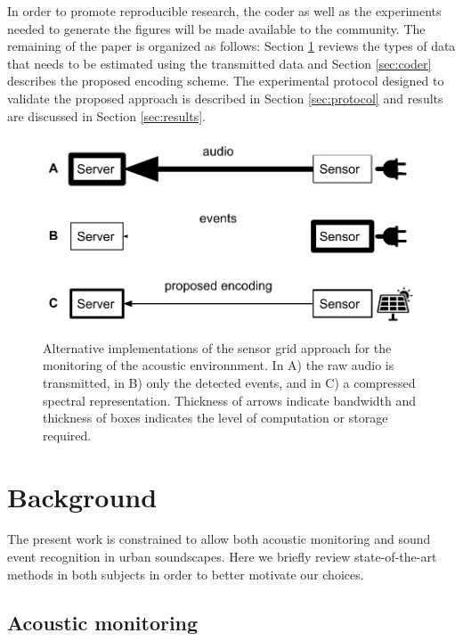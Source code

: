 \documentclass[final,3p,times,twocolumn]{elsarticle}
\begin{document}
In order to promote reproducible research, the coder as well as the experiments needed to generate the figures will be made available to the community. The remaining of the paper is organized as follows: Section \ref{sec:background} reviews the types of data that needs to be estimated using the transmitted data and Section \ref{sec:coder} describes the proposed encoding scheme. The experimental protocol designed to validate the proposed approach is described in Section \ref{sec:protocol} and results are discussed in Section \ref{sec:results}.


\begin{figure}[t]
\includegraphics[width=\columnwidth]{figures/censeCoder}
\vspace{-0.15in}
\caption{Alternative implementations of the sensor grid approach for the monitoring of the acoustic environnment. In A) the raw audio is transmitted, in B) only the detected events, and in C) a compressed spectral representation. Thickness of arrows indicate bandwidth and thickness of boxes indicates the level of computation or storage required.}
\label{fig:codingScheme}
\end{figure}


\section{Background} \label{sec:background}


The present work is constrained to allow both acoustic monitoring and sound event recognition in urban soundscapes. Here we briefly review state-of-the-art methods in both subjects in order to better motivate our choices.

\subsection{Acoustic monitoring}
\end{document}
